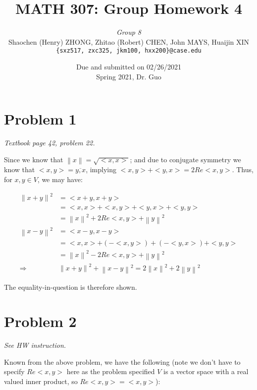 \documentclass[11pt]{article}
\newcommand{\ilc}{\texttt}
\providecommand{\norm}[1]{\left\lVert #1 \right\rVert}
\begin{document}
\title{\textbf{MATH 307: Group Homework 4}}


\author{\textit{Group 8}\\
Shaochen (Henry) ZHONG, Zhitao (Robert) CHEN, John MAYS, Huaijin XIN\\ \ilc{\{sxz517, zxc325, jkm100, hxx200\}@case.edu}}

\date{Due and submitted on 02/26/2021 \\ Spring 2021, Dr. Guo}
\maketitle



\section*{Problem 1}
\textit{Textbook page 42, problem 22.}\newline

Since we know that $\norm{x} = \sqrt{<x, x>}$; and due to conjugate symmetry we know that $<x, y> = \overline{y, x}$, implying $<x, y> + <y, x> =  2 Re<x, y>$. Thus, for $x, y \in V$, we may have:

\begin{align*}
    \norm{x + y}^2 &= <x + y, x + y> \\
    &= <x, x> + <x, y> + <y, x> + <y, y> \\
    &= \norm{x}^2 + 2 Re<x, y> + \norm{y}^2 \\
    \norm{x - y}^2 &= <x - y, x - y> \\
    &= <x, x> + (-<x, y>) + (-<y, x>) + <y, y> \\
    &= \norm{x}^2 - 2 Re<x, y>+ \norm{y}^2 \\
    \Longrightarrow& \norm{x + y}^2 + \norm{x - y}^2 = 2\norm{x}^2 + 2\norm{y}^2
\end{align*}

The equality-in-question is therefore shown.

\section*{Problem 2}
\textit{See HW instruction.}\newline

Known from the above problem, we have the following (note we don't have to specify $Re<x, y>$ here as the problem specified $V$ is a vector space with a real valued inner product, so $Re<x, y> = <x, y>$):
\end{document}
